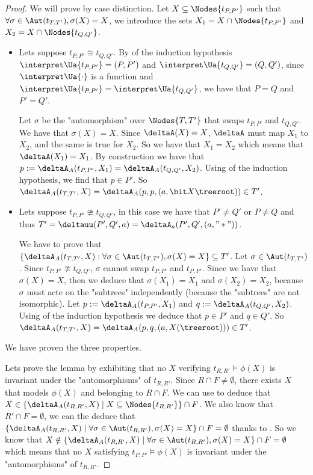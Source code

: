 \documentclass[a4paper,UKenglish,cleveref, autoref, thm-restate]{lipics-v2021}
\begin{document}
\begin{proof}
	We will prove  by case distinction.
	Let $X \subseteq \Nodes {t_{P,P'}}$ such that $\forall \sigma \in \Aut (t_{T,T'}), \sigma(X) = X$, we introduce the
	sets $X_1 = X \cap \Nodes {t_{P,P'}}$ and $X_2 = X \cap \Nodes {t_{Q,Q'}}$.
	\begin{itemize}
		\item Lets suppose $t_{P,P'} \cong t_{Q,Q'}$.
		      By  of the induction hypothesis
		      $\interpret \Ua {t_{P,P'}} = (P,P')$ and $\interpret \Ua {t_{Q,Q'}} = (Q,Q')$, since $\interpret \Ua {\cdot}$ is a function
		      and $\interpret \Ua {t_{P,P'}} = \interpret \Ua {t_{Q,Q'}}$, we have that $P = Q$ and $P' = Q'$.

		      Let $\sigma$ be the "automorphism" over $\Nodes{T,T'}$ that swaps  $t_{P,P'}$ and $t_{Q,Q'}$.
		      We have that $\sigma (X) = X$. Since $\deltaA(X) = X$, $\deltaA$ must map $X_1$ to $X_2$, and the same is true for
		      $X_2$. So we have that $X_1 = X_2$ which means that $\deltaA(X_1) = X_1$. By construction we have that $p := \deltaA_A(t_{P,P'}, X_1) =  \deltaA_A(t_{Q,Q'}, X_2)$.
		      Using  of the induction hypothesis, we find that $p \in P'$. So
		      $\deltaA_A (t_{T,T'}, X) = \deltaA_A(p,p,(a, \bit X {\treeroot})) \in T'$.

		\item Lets suppose $t_{P,P'} \ncong t_{Q,Q'}$, in this case we have that $P' \neq Q'$ or $P \neq Q$ and thus $T' = \deltauu (P',Q',a) = \deltaA_a(P',Q',(a,"*"))$.

		      We have to prove that
		      $\{ \deltaA_A (t_{T,T'},X) : \forall \sigma \in \Aut(t_{T,T'}), \sigma(X) = X\} \subseteq T'$.
		      Let $\sigma \in \Aut(t_{T,T'})$. Since $t_{P,P'} \ncong t_{Q,Q'}$, $\sigma$ cannot swap $t_{P,P'}$ and
		      $t_{P,P'}$.
		      Since we have that $\sigma(X) = X$, then we deduce that $\sigma(X_1) = X_1$ and
		      $\sigma(X_2) = X_2$, because $\sigma$ must acte on the "subtrees" independently (because the "subtrees" are not isomorphic).
		      Let $p := \deltaA_A (t_{P,P'}, X_1)$ and $q := \deltaA_A (t_{Q,Q'}, X_2)$.
		      Using  of the induction hypothesis we deduce that $p \in P'$ and $q \in Q'$.
		      So $\deltaA_A (t_{T,T'}, X) = \deltaA_A(p,q,(a, X(\treeroot))) \in T'$.
	\end{itemize}
	We have proven the three properties.

	Lets prove the lemma by exhibiting that no $X$ verifying $t_{R,R'} \models \phi(X)$ is invariant under the "automorphisms" of $t_{R,R'}$.
	Since $R \cap F \neq \emptyset$, there exists $X$ that models $\phi(X)$ and  belonging to $R \cap F$. We can use  to deduce that
	$X \in \{ \deltaA_A (t_{R,R'},X) \mid X \subseteq \Nodes {t_{R,R'}}\} \cap F$.
	We also know that $R' \cap F = \emptyset$, we can the deduce that $\{ \deltaA_A (t_{R,R'},X) \mid \forall \sigma \in \Aut(t_{R,R'}), \sigma(X) = X\} \cap F = \emptyset$
	thanks to . So we know that $X \notin \{ \deltaA_A (t_{R,R'},X) \mid \forall \sigma \in \Aut(t_{R,R'}), \sigma(X) = X\} \cap F = \emptyset$ which means that no
	$X$ satisfying $t_{P,P'} \models \phi(X)$ is invariant under the "automorphisms" of $t_{R,R'}$.
\end{proof}
\end{document}
